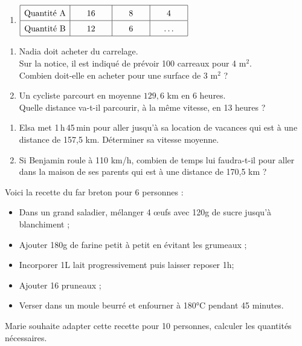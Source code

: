 \documentclass[11pt]{article}
\begin{document}
\begin{exercicedevoir}
\begin{multicols}{2}
\begin{enumerate}
\item 
$\renewcommand{\arraystretch}{1.5}
\begin{array}{|c|c|c|c|}
\hline
\text{Quantité A} & \phantom{000}16\phantom{000} & \phantom{000}8\phantom{000} & \phantom{000}4\phantom{000} \\ 
\hline
\text{Quantité B} & 12 & 6 & \ldots \\ 
\hline
\end{array}$
\end{enumerate}
\end{multicols}



\end{exercicedevoir}

\begin{exercicedevoir}
\begin{enumerate}
\item Nadia doit acheter du carrelage. \\Sur la notice, il est indiqué de prévoir 100 carreaux pour 4 m$^2$. \\ Combien doit-elle en acheter pour une surface de 3 m$^2$ ?
\item Un cycliste parcourt en moyenne $129,6$ km en 6 heures.
\\ Quelle distance va-t-il parcourir, à la même vitesse, en 13 heures ?
\end{enumerate}
\end{exercicedevoir}

\begin{exercicedevoir}
\begin{enumerate} 
\item Elsa met 1\,h\,45\,min pour aller jusqu'à sa location de vacances qui est à une distance de 157{,}5 km. Déterminer sa vitesse moyenne.
\item Si Benjamin roule à 110 km/h, combien de temps lui faudra-t-il  pour aller dans la maison de ses parents qui est à une distance de 170{,}5 km ?
\end{enumerate}
\end{exercicedevoir}

\begin{exercicedevoir}
Voici la recette du far breton pour 6 personnes :
\begin{itemize}
    \item Dans un grand saladier, mélanger 4 œufs avec 120g de sucre jusqu'à blanchiment ;
    \item Ajouter 180g de farine petit à petit en évitant les grumeaux ;
    \item Incorporer 1L lait progressivement puis laisser reposer 1h;
    \item Ajouter 16 pruneaux ;
    \item Verser dans un moule beurré et enfourner à 180°C pendant 45 minutes.
\end{itemize}
Marie souhaite adapter cette recette pour 10 personnes, calculer les
quantités nécessaires.
\end{exercicedevoir}

\nonewpage
\end{document}
